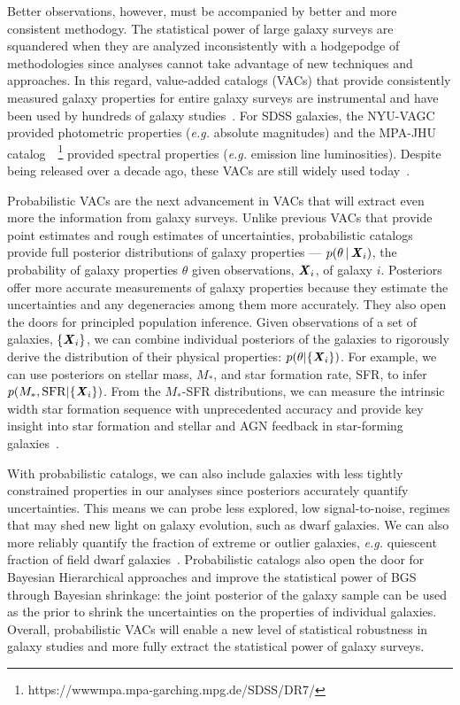 Better observations, however, must be accompanied by better and more consistent
methodogy. 
The statistical power of large galaxy surveys are squandered when they are
analyzed inconsistently with a hodgepodge of methodologies since analyses
cannot take advantage of new techniques and approaches. 
In this regard, value-added catalogs (VACs) that provide consistently measured
galaxy properties for entire galaxy surveys are instrumental and have been
used by hundreds of galaxy studies~\citep[see][for a review]{blanton2009}.
For SDSS galaxies, the NYU-VAGC~\citep{blanton2005} provided photometric
properties (\emph{e.g.} absolute magnitudes) and the MPA-JHU
catalog~~\citep{brinchmann2004}\footnote{https://wwwmpa.mpa-garching.mpg.de/SDSS/DR7/}
provided spectral properties (\emph{e.g.} emission line luminosities).
Despite being released over a decade ago, these VACs are still widely used
today~\citep[\emph{e.g.}][]{alpaslan2021, odonnell2021, trevisan2021}. 

Probabilistic VACs are the next advancement in VACs that will extract even more
the information from galaxy surveys. 
Unlike previous VACs that provide point estimates and rough estimates of
uncertainties, probabilistic catalogs provide full posterior distributions of
galaxy properties --- $p(\theta\,|\,{\textbf{\textit{X}}_i})$, the probability of galaxy
properties $\theta$ given observations, ${\textbf{\textit{X}}_i}$, of galaxy $i$.
Posteriors offer more accurate measurements of galaxy properties because they
estimate the uncertainties and any degeneracies among them more accurately. 
They also open the doors for principled population inference.
Given observations of a set of galaxies, $\{{\textbf{\textit{X}}_i}\}$, we can combine
individual posteriors of the galaxies to rigorously derive the distribution of
their physical properties: $p(\theta | \{ {\textbf{\textit{X}}_i} \})$.
For example, we can use posteriors on stellar mass, $M_*$, and star formation
rate, SFR, to infer $p(M_*, {\rm SFR} | \{ {\textbf{\textit{X}}_i} \})$. 
From the $M_*$-SFR distributions, we can measure the intrinsic width star
formation sequence with unprecedented accuracy and provide key insight into
star formation and stellar and AGN feedback in star-forming
galaxies~\citep[\emph{e.g.}][]{davies2021, curtis-lake2021}.

With probabilistic catalogs, we can also include galaxies with less
tightly constrained properties in our analyses since posteriors accurately
quantify uncertainties. 
This means we can probe less explored, low signal-to-noise, regimes that may
shed new light on galaxy evolution, such as dwarf galaxies.
We can also more reliably quantify the fraction of extreme or outlier
galaxies, \emph{e.g.} quiescent fraction of field dwarf
galaxies~\citep{geha2012}.
Probabilistic catalogs also open the door for Bayesian Hierarchical approaches
and improve the statistical power of BGS through Bayesian shrinkage: the joint
posterior of the galaxy sample can be used as the prior to shrink the
uncertainties on the properties of individual galaxies. 
Overall, probabilistic VACs will enable a new level of statistical robustness
in galaxy studies and more fully extract the statistical power of galaxy surveys.

